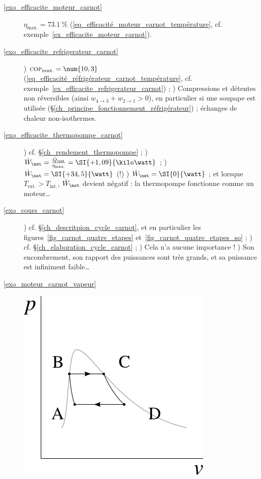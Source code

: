 \exercisesolutionpage
\titreresultats

	\begin{description}
		\item [\ref{exo_efficacite_moteur_carnot}] 
					\tab $\eta_\text{max.} = \SI{73,1}{\percent}$ (\ref{eq_efficacité_moteur_carnot_température}, cf. exemple~\ref{ex_efficacite_moteur_carnot}).
		\item [\ref{exo_efficacite_refrigerateur_carnot}] 
					) $\textsc{cop}_\text{max.} = \num{10,3}$ (\ref{eq_efficacité_réfrigérateur_carnot_température}, cf. exemple~\ref{ex_efficacite_refrigerateur_carnot}) ;
					) Compressions et détentes non réversibles (ainsi $w_{4\to 3} + w_{2\to 1} > 0$), en particulier si une soupape est utilisée (\S\ref{ch_principe_fonctionnement_réfrigérateur}) ; échanges de chaleur non-isothermes.
		\item [\ref{exo_efficacite_thermopompe_carnot}]
					) cf. \S\ref{ch_rendement_thermopompe}	;
					) $\dot W_\net = \frac{\dot Q_\out}{\eta_\text{max.}} = \SI{+1,09}{\kilo\watt}$ ;
					) $\dot W_\net = \SI{+34,5}{\watt}$ (!) 
					) $\dot W_\net = \SI{0}{\watt}$ ; et lorsque $T_\text{ext.} > T_\text{int.}$, $\dot W_\net$ devient négatif : la thermopompe fonctionne comme un moteur…
		\item [\ref{exo_cours_carnot}]
					) cf. \S\ref{ch_descritpion_cycle_carnot}, et en particulier les figures~\ref{fig_carnot_quatre_etapes} et~\ref{fig_carnot_quatre_etapes_so} ;
					) cf. \S\ref{ch_elaboration_cycle_carnot} ;
					) Cela n’a aucune importance !
					) Son encombrement, son rapport des puissances sont très grands, et sa puissance est infiniment faible…
		\item [\ref{exo_moteur_carnot_vapeur}] 
					\includegraphics[width=\solutiondiagramwidth]{images/exo_sol_pv_carnot_lv_1.png}

\end{description}
